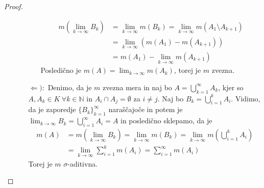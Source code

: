 \documentclass[a4paper, 10pt]{article}
\newcommand{\mth}[1]{\ensuremath{\mathbb{#1}}}
\newcommand{\N}{\mth{N}}
\begin{document}
\begin{proof}
\begin{enumerate}
\begin{itemize}
\begin{itemize}
\begin{align*}
							m(\lim_{k\to\infty}B_k) &= \lim_{k\to\infty}m(B_k) = \lim_{k\to\infty}m(A_1 \setminus A_{k+1}) \\
							&= \lim_{k\to\infty}(m(A_1) - m(A_{k+1})) \\
							&= m(A_1) - \lim_{k\to\infty}m(A_{k+1})
						\end{align*}
						Posledično je $m(A) = \lim_{k\to\infty}m(A_k)$, torej je $m$ zvezna.
					\end{itemize}
					\item[$\Leftarrow):$] Denimo, da je $m$ zvezna mera in naj bo $A=\bigcup_{k = 1}^\infty A_k$, kjer so $A, A_k \in K~\forall k\in\N$ in $A_i\cap A_j = \emptyset$ za $i\neq j$. Naj bo $B_k = \bigcup_{i = 1}^{k}A_i$. Vidimo, da je zaporedje $\{B_k\}_{k=1}^\infty$ naraščajoče in potem je $\lim_{k\to\infty}B_k = \bigcup_{i = 1}^\infty A_i = A$ in posledično sklepamo, da je \begin{align*} m(A) &= m(\lim_{k\to\infty}B_k) = \lim_{k\to\infty}m(B_k) = \lim_{k\to\infty}m(\bigcup_{i = 1}^k A_i) \\
						&= \lim_{k\to\infty}\sum_{i = 1}^k m(A_i) = \sum_{i = 1}^\infty m(A_i)
					\end{align*}
					Torej je $m$ $\sigma$-aditivna.
				\end{itemize}
			\end{enumerate}
		\end{proof}
		
\end{document}
